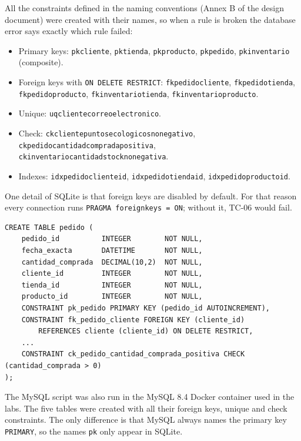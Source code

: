\documentclass[11pt]{article}
\renewcommand{\_}{\oldus\allowbreak}
\begin{document}
All the constraints defined in the naming conventions (Annex B of the design document) were created
with their names, so when a rule is broken the database error says exactly which rule failed:

\begin{itemize}[itemsep=0.1em]
  \item Primary keys: \texttt{pk\_cliente}, \texttt{pk\_tienda}, \texttt{pk\_producto}, \texttt{pk\_pedido}, \texttt{pk\_inventario} (composite).
  \item Foreign keys with \texttt{ON DELETE RESTRICT}: \texttt{fk\_pedido\_cliente}, \texttt{fk\_pedido\_tienda}, \texttt{fk\_pedido\_producto}, \texttt{fk\_inventario\_tienda}, \texttt{fk\_inventario\_producto}.
  \item Unique: \texttt{uq\_cliente\_correo\_electronico}.
  \item Check: \texttt{ck\_cliente\_puntos\_ecologicos\_no\_negativo}, \texttt{ck\_pedido\_cantidad\_comprada\_positiva}, \texttt{ck\_inventario\_cantidad\_stock\_no\_negativa}.
  \item Indexes: \texttt{idx\_pedido\_cliente\_id}, \texttt{idx\_pedido\_tienda\_id}, \texttt{idx\_pedido\_producto\_id}.
\end{itemize}

One detail of SQLite is that foreign keys are disabled by default. For that reason every
connection runs \texttt{PRAGMA foreign\_keys = ON}; without it, TC-06 would fail.

\begin{lstlisting}[caption={Part of \texttt{schema\_sqlite.sql}: the \texttt{pedido} table.}]
CREATE TABLE pedido (
    pedido_id          INTEGER        NOT NULL,
    fecha_exacta       DATETIME       NOT NULL,
    cantidad_comprada  DECIMAL(10,2)  NOT NULL,
    cliente_id         INTEGER        NOT NULL,
    tienda_id          INTEGER        NOT NULL,
    producto_id        INTEGER        NOT NULL,
    CONSTRAINT pk_pedido PRIMARY KEY (pedido_id AUTOINCREMENT),
    CONSTRAINT fk_pedido_cliente FOREIGN KEY (cliente_id)
        REFERENCES cliente (cliente_id) ON DELETE RESTRICT,
    ...
    CONSTRAINT ck_pedido_cantidad_comprada_positiva CHECK (cantidad_comprada > 0)
);
\end{lstlisting}

The MySQL script was also run in the MySQL 8.4 Docker container used in the labs. The five tables
were created with all their foreign keys, unique and check constraints. The only difference is that
MySQL always names the primary key \texttt{PRIMARY}, so the names \texttt{pk\_*} only appear in
SQLite.
\end{document}
